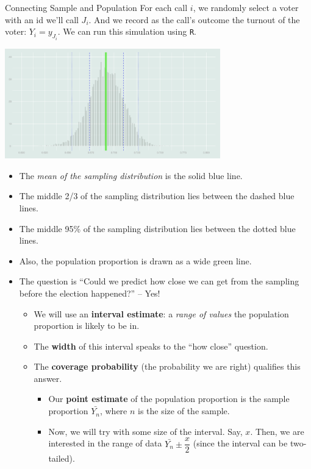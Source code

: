 \begin{eg}{Connecting Sample and Population}
	For each call $i$, we randomly select a voter with an id we'll call $J_i$. And we record as the call's outcome the turnout of the voter: $Y_i=y_{J_i}$. We can run this simulation using \texttt{R}. 
	\begin{center}
		\includegraphics[width=0.7\textwidth]{figs/SamplingDistribution.png}	
	\end{center}
	\begin{itemize}
		\item The \textit{mean of the sampling distribution} is the solid blue line.
		\item The middle 2/3 of the sampling distribution lies between the dashed blue lines.
		\item The middle 95\% of the sampling distribution lies between the dotted blue lines. 
		\item Also, the population proportion is drawn as a wide green line. 
		\item The question is ``Could we predict how close we can get from the sampling before the election happened?'' -- Yes!
		\begin{itemize}
			\item We will use an \textbf{interval estimate}: a \textit{range of values} the population proportion is likely to be in.
			\item The \textbf{width} of this interval speaks to the ``how close'' question.
			\item The \textbf{coverage probability} (the probability we are right) qualifies this answer.
			\begin{itemize}
				\item Our \textbf{point estimate} of the population proportion is the sample proportion $\bar{Y_n}$, where $n$ is the size of the sample. 
				\item Now, we will try with some size of the interval. Say, $x$. Then, we are interested in the range of data $\bar{Y_n}\pm\dfrac{x}{2}$ (since the interval can be two-tailed).

\end{itemize}
\end{itemize}
\end{itemize}
\end{eg}
